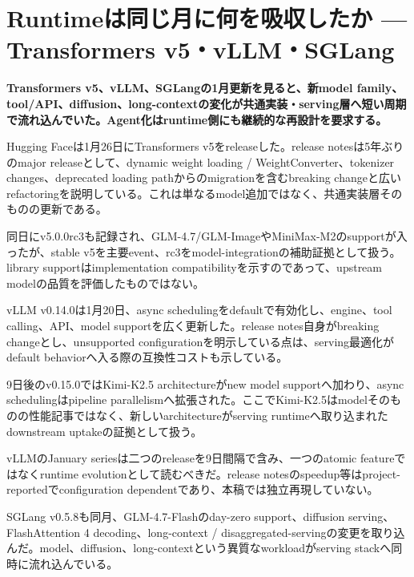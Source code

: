 \section{Runtimeは同じ月に何を吸収したか — Transformers v5・vLLM・SGLang}
\noindent\textbf{Transformers v5、vLLM、SGLangの1月更新を見ると、新model family、tool/API、diffusion、long-contextの変化が共通実装・serving層へ短い周期で流れ込んでいた。Agent化はruntime側にも継続的な再設計を要求する。}\autocite{src-152188dd686e,src-3bc80a3c7870,src-6a97353d35a9}

Hugging Faceは1月26日にTransformers v5をreleaseした。release notesは5年ぶりのmajor releaseとして、dynamic weight loading / WeightConverter、tokenizer changes、deprecated loading pathからのmigrationを含むbreaking changeと広いrefactoringを説明している。これは単なるmodel追加ではなく、共通実装層そのものの更新である。\autocite{src-152188dd686e}


\begin{claimboundary}
同日にv5.0.0rc3も記録され、GLM-4.7/GLM-ImageやMiniMax-M2のsupportが入ったが、stable v5を主要event、rc3をmodel-integrationの補助証拠として扱う。library supportはimplementation compatibilityを示すのであって、upstream modelの品質を評価したものではない。\autocite{src-152188dd686e,src-9f7ae4228266}
\end{claimboundary}

vLLM v0.14.0は1月20日、async schedulingをdefaultで有効化し、engine、tool calling、API、model supportを広く更新した。release notes自身がbreaking changeとし、unsupported configurationを明示している点は、serving最適化がdefault behaviorへ入る際の互換性コストも示している。\autocite{src-3bc80a3c7870}


9日後のv0.15.0ではKimi-K2.5 architectureがnew model supportへ加わり、async schedulingはpipeline parallelismへ拡張された。ここでKimi-K2.5はmodelそのものの性能記事ではなく、新しいarchitectureがserving runtimeへ取り込まれたdownstream uptakeの証拠として扱う。\autocite{src-d9f9de620203}


\begin{claimboundary}
vLLMのJanuary seriesは二つのreleaseを9日間隔で含み、一つのatomic featureではなくruntime evolutionとして読むべきだ。release notesのspeedup等はproject-reportedでconfiguration dependentであり、本稿では独立再現していない。\autocite{src-3bc80a3c7870,src-d9f9de620203}
\end{claimboundary}

SGLang v0.5.8も同月、GLM-4.7-Flashのday-zero support、diffusion serving、FlashAttention 4 decoding、long-context / disaggregated-servingの変更を取り込んだ。model、diffusion、long-contextという異質なworkloadがserving stackへ同時に流れ込んでいる。\autocite{src-6a97353d35a9}


